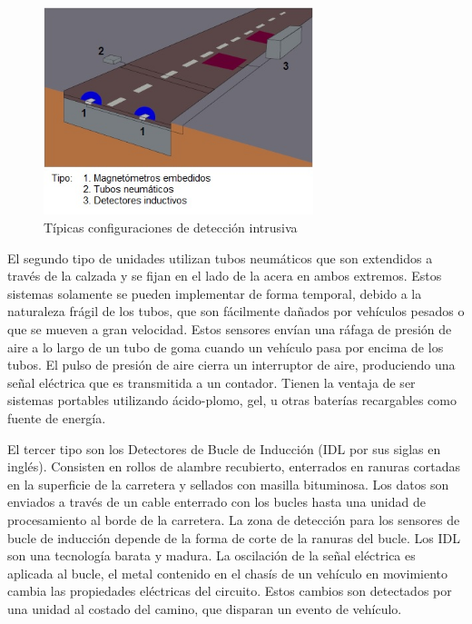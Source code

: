 \begin{figure}[h]
	\centering
	\includegraphics[width=0.7\textwidth]{capitulos/3/figuras/figura1.jpg}
	\caption{\label{fig:intrusiva} Típicas configuraciones de detección intrusiva}	
\end{figure}

El segundo tipo de unidades utilizan tubos neumáticos que son extendidos a través de la calzada y se fijan en el lado de la acera en ambos extremos. Estos sistemas solamente se pueden implementar de forma temporal, debido a la naturaleza frágil de los tubos, que son fácilmente dañados por vehículos pesados o que se mueven a gran velocidad. Estos sensores envían una ráfaga de presión de aire a lo largo de un tubo de goma cuando un vehículo pasa por encima de los tubos. El pulso de presión de aire cierra un interruptor de aire, produciendo una señal eléctrica que es transmitida a un contador. Tienen la ventaja de ser sistemas portables utilizando ácido-plomo, gel, u otras baterías recargables como fuente de energía.

El tercer tipo son los Detectores de Bucle de Inducción (IDL por sus siglas en inglés). Consisten en rollos de alambre recubierto, enterrados en ranuras cortadas en la superficie de la carretera y sellados con masilla bituminosa. Los datos son enviados a través de un cable enterrado con los bucles hasta una unidad de procesamiento al borde de la carretera. La zona de detección para los sensores de bucle de inducción depende de la forma de corte de la ranuras del bucle. Los IDL son una tecnología barata y madura. La oscilación de la señal eléctrica es aplicada al bucle, el metal contenido en el chasís de un vehículo en movimiento cambia las propiedades eléctricas del circuito. Estos cambios son detectados por una unidad al costado del camino, que disparan un evento de vehículo.

